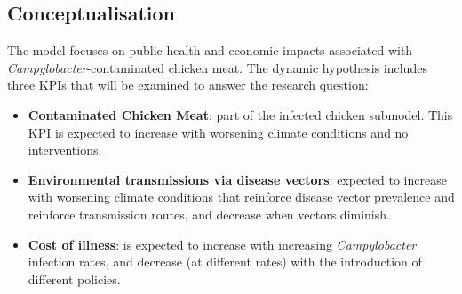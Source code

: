 \subsection{Conceptualisation}
\label{s:conceptualisation}
The model focuses on public health and economic impacts associated with \textit{Campylobacter}-contaminated chicken meat. The dynamic hypothesis includes three KPIs that will be examined to answer the research question: 
\begin{itemize}
    \item \textbf{Contaminated Chicken Meat}: part of the infected chicken submodel. This KPI is expected to increase with worsening climate conditions and no interventions.
    \item \textbf{Environmental transmissions via disease vectors}: expected to increase with worsening climate conditions that reinforce disease vector prevalence and reinforce transmission routes, and decrease when vectors diminish.
    \item \textbf{Cost of illness}: is expected to increase with increasing \textit{Campylobacter} infection rates, and decrease (at different rates) with the introduction of different policies.
\end{itemize}
 
